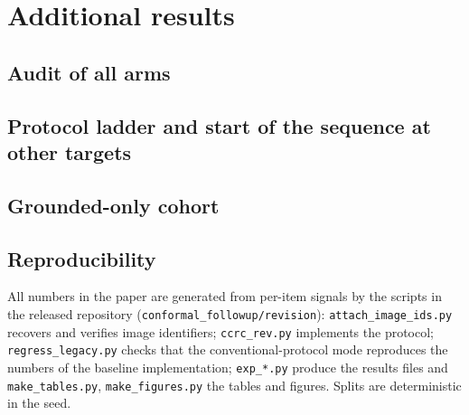 \section{Additional results}

\subsection{Audit of all arms}
\label{app:audit}
\begin{table}[h]
\centering
\caption{Certified coverage (\%) with abort rate (ab) and validity statistics for every arm, all items. exc is the
fraction of non-aborted splits whose test-fold risk exceeds $\alpha$; cv is the fraction whose one-sided $90\%$
Clopper--Pearson lower bound on test risk exceeds $\alpha$. The fixed $q{=}0.10$ gate was chosen with knowledge of
these benchmarks and is not certified.}
\label{tab:audit}
\tiny
\resizebox{\textwidth}{!}{}
\end{table}

\subsection{Protocol ladder and start of the sequence at other targets}
\label{app:ladder}
\begin{table}[h]
\centering
\caption{As Table~\ref{tab:ladder} at $\alpha=0.15$.}
\small
\resizebox{\textwidth}{!}{}
\end{table}
\begin{table}[h]
\centering
\caption{As Table~\ref{tab:start} at $\alpha=0.05$.}
\scriptsize
\resizebox{\textwidth}{!}{}
\end{table}
\begin{table}[h]
\centering
\caption{As Table~\ref{tab:start} at $\alpha=0.15$.}
\scriptsize
\resizebox{\textwidth}{!}{}
\end{table}

\subsection{Grounded-only cohort}
\label{app:grounded}
\begin{table}[h]
\centering
\caption{As Table~\ref{tab:main} restricted to items with a detector value; no bootstrap.}
\small
\resizebox{\textwidth}{!}{}
\end{table}

\subsection{Reproducibility}
All numbers in the paper are generated from per-item signals by the scripts in the released repository
(\texttt{conformal\_followup/revision}): \texttt{attach\_image\_ids.py} recovers and verifies image identifiers;
\texttt{ccrc\_rev.py} implements the protocol; \texttt{regress\_legacy.py} checks that the conventional-protocol mode reproduces the
numbers of the baseline implementation; \texttt{exp\_*.py} produce the results files and \texttt{make\_tables.py},
\texttt{make\_figures.py} the tables and figures. Splits are deterministic in the seed.
